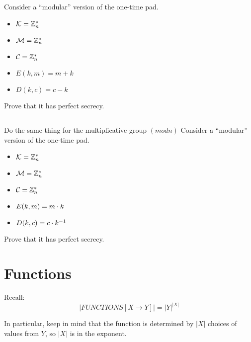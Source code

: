 \documentclass[12pt]{article}
\begin{document}
\section{}

\subsection{}


Consider a ``modular'' version of the one-time pad.

\begin{itemize}
\item $\mathcal{K} = \mathbb{Z}_n^*$
\item $\mathcal{M} = \mathbb{Z}_n^*$
\item $\mathcal{C} = \mathbb{Z}_n^*$
\item $E(k, m) = m + k$
\item $D(k, c) = c - k$
\end{itemize}

Prove that it has perfect secrecy.
\subsection{}


Do the same thing for the multiplicative group $(mod n)$
Consider a ``modular'' version of the one-time pad.

\begin{itemize}
\item $\mathcal{K} = \mathbb{Z}_n^*$
\item $\mathcal{M} = \mathbb{Z}_n^*$
\item $\mathcal{C} = \mathbb{Z}_n^*$
\item $E(k, m) = m \cdot k$
\item $D(k, c) = c \cdot k^{-1}$
\end{itemize}

Prove that it has perfect secrecy.




\section{Functions}

Recall:
$$\Big|FUNCTIONS[X \to Y]\Big| = |Y|^{|X|}$$

In particular, keep in mind that the function is determined by $|X|$ choices of values from $Y$, so $|X|$ is in the exponent.

\subsection{}
\end{document}
